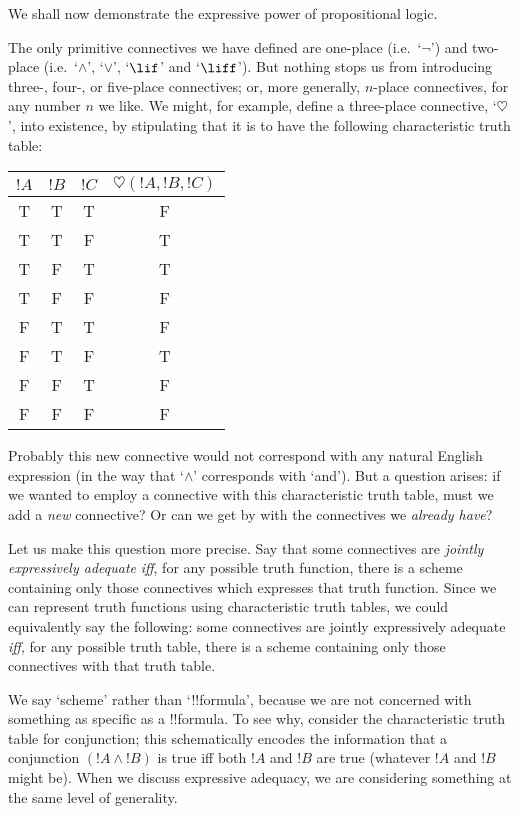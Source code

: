 \documentclass[../../../include/open-logic-section]{subfiles}
\begin{document}


We shall now demonstrate the expressive power of propositional logic.

The only primitive connectives we have defined are one-place (i.e.\ `$\lnot$') and two-place (i.e.\ `$\land$', `$\lor$', `$\lif$' and `$\liff$'). But nothing stops us from introducing three-, four-, or five-place connectives; or, more generally, $n$-place connectives, for any number $n$ we like. We might, for example, define a three-place connective, `$\heartsuit$', into existence, by stipulating that it is to have the following characteristic truth table:
\begin{center}
\begin{tabular}{c c c | c}
${!A}$ & ${!B}$ & ${!C}$ & $\heartsuit({!A},{!B},{!C})$\\
\hline
 T & T & T & F \\
 T & T & F & T \\
 T & F & T & T \\
 T & F & F & F \\
 F & T & T & F \\
 F & T & F & T \\
 F & F & T & F \\
 F & F & F & F
\end{tabular}
\end{center}
Probably this new connective would not correspond with any natural English expression (in the way that `$\land$' corresponds with `and'). But a question arises: if we wanted to employ a connective with this characteristic truth table, must we add a \emph{new} connective? Or can we get by with the connectives we \emph{already have}?

Let us make this question more precise. Say that some connectives are \emph{jointly expressively adequate} \emph{iff}, for any possible truth function, there is a scheme containing only those connectives which expresses that truth function. Since we can represent truth functions using characteristic truth tables, we could equivalently say the following: some connectives are jointly expressively adequate \emph{iff}, for any possible truth table, there is a scheme containing only those connectives with that truth table.

We say `scheme' rather than `!!{formula}', because we are not concerned with something as specific as a !!{formula}. To see why, consider the characteristic truth table for conjunction; this schematically encodes the information that a conjunction $({!A} \land {!B})$ is true iff both ${!A}$ and ${!B}$ are true (whatever ${!A}$ and ${!B}$ might be). When we discuss expressive adequacy, we are considering something at the same level of generality. 
\end{document}
